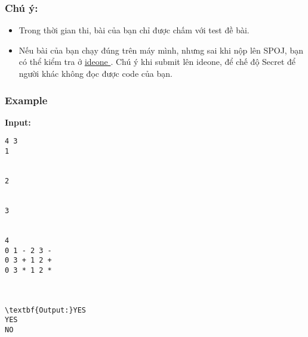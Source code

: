 \subsubsection{   Chú ý:  }
\begin{itemize}
	\item     Trong thời gian thi, bài của bạn chỉ được chấm với test đề bài.   
	\item     Nếu bài của bạn chạy đúng trên máy mình, nhưng sai khi nộp lên SPOJ, bạn có thể kiểm tra ở    \href{https://ideone.com}{     ideone    }    . Chú ý khi submit lên ideone, để chế độ Secret để người khác không đọc được code của bạn.   
\end{itemize}

\subsubsection{   Example  }

\textbf{    Input:   }
\begin{verbatim}
4 3
1


2


3


4
0 1 - 2 3 -
0 3 + 1 2 +
0 3 * 1 2 *



\textbf{Output:}YES
YES
NO\end{verbatim}
